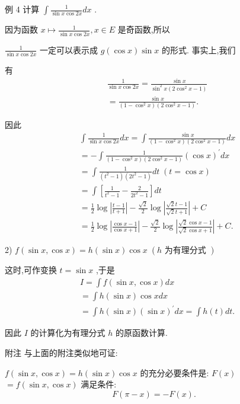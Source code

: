 例 4 计算 $\int \frac{1}{\sin x\cos {2x}}{dx}$ .

因为函数 $x \mapsto  \frac{1}{\sin x\cos {2x}},x \in  E$ 是奇函数,所以

$\frac{1}{\sin x\cos {2x}}$ 一定可以表示成 $g\left( {\cos x}\right) \sin x$ 的形式. 事实上,我们

有
\begin{align*}
	&\frac{1}{\sin x\cos {2x}} = \frac{\sin x}{{\sin }^{2}x\left( {2{\cos }^{2}x - 1}\right) }\\
	&= \frac{\sin x}{\left( {1 - {\cos }^{2}x}\right) \left( {2{\cos }^{2}x - 1}\right) }.
\end{align*}

因此
\begin{align*}
	&\int \frac{1}{\sin x\cos {2x}}{dx} = \int \frac{\sin x}{\left( {1 - {\cos }^{2}x}\right) \left( {2{\cos }^{2}x - 1}\right) }{dx}\\
	&=  - \int \frac{1}{\left( {1 - {\cos }^{2}x}\right) \left( {2{\cos }^{2}x - 1}\right) }{\left( \cos x\right) }^{\prime }{dx}\\
	&= \int \frac{1}{\left( {{t}^{2} - 1}\right) \left( {2{t}^{2} - 1}\right) }{dt}\;\left( {t = \cos x}\right)\\
	&= \int \left\lbrack  {\frac{1}{{t}^{2} - 1} - \frac{2}{2{t}^{2} - 1}}\right\rbrack  {dt}\\
	&= \frac{1}{2}\log \left| \frac{t - 1}{t + 1}\right|  - \frac{\sqrt{2}}{2}\log \left| \frac{\sqrt{2}t - 1}{\sqrt{2}t + 1}\right|  + C\\
	&= \frac{1}{2}\log \left| \frac{\cos x - 1}{\cos x + 1}\right|  - \frac{\sqrt{2}}{2}\log \left| \frac{\sqrt{2}\cos x - 1}{\sqrt{2}\cos x + 1}\right|  + C.
\end{align*}

2) $f\left( {\sin x,\cos x}\right)  = h\left( {\sin x}\right) \cos x\;\left( {h\text{ 为有理分式 }}\right)$

这时,可作变换 $t = \sin x$ ,于是
\begin{align*}
	&I = \int f\left( {\sin x,\cos x}\right) {dx}\\
	&= \int h\left( {\sin x}\right) \cos {xdx}\\
	&= \int h\left( {\sin x}\right) {\left( \sin x\right) }^{\prime }{dx} = \int h\left( t\right) {dt}.
\end{align*}

因此 $I$ 的计算化为有理分式 $h$ 的原函数计算.

附注 与上面的附注类似地可证:

$f\left( {\sin x,\cos x}\right)  = h\left( {\sin x}\right) \cos x$ 的充分必要条件是: $F\left( x\right)$  $= f\left( {\sin x,\cos x}\right)$ 满足条件:
$$F\left( {\pi  - x}\right)  =  - F\left( x\right) .$$

